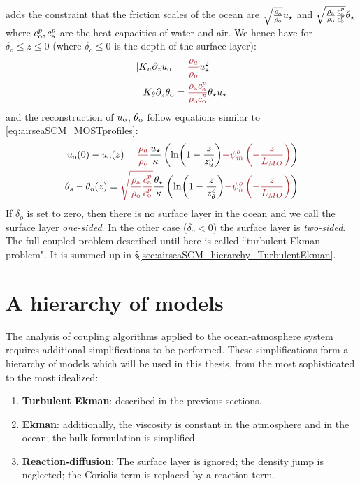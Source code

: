 adds the constraint that the friction scales of the ocean are
$\sqrt{\frac{\rho_{\rm a}} {\rho_{\rm o}}} u_\star$ and
$\sqrt{\frac{\rho_{\rm a}}{\rho_{\rm o}}
\frac{c_{\rm a}^p}{c_{\rm o}^p}}
\theta_\star$ where $c_{\rm o}^p, c_{\rm a}^p$
are the heat capacities of water and air.
We hence have for $\delta_o \leq z \leq 0$ (where $\delta_o \leq 0$
is the depth of the surface layer):
\begin{equation}
	\begin{aligned}
	|K_u \partial_z u_{\rm o}| &= \emphase{\frac{\rho_a}{\rho_o}}
	u_\star^2\\
	K_\theta \partial_z \theta_{\rm o} &=
	\emphase{\frac{\rho_{\rm a} c_{\rm a}^p}
			{\rho_{\rm o} c_{\rm o}^p}}
	\theta_\star u_\star
	\end{aligned}
\end{equation}
and the reconstruction of $u_{\rm o}$, $\theta_{\rm o}$
follow equations similar to \eqref{eq:airseaSCM_MOSTprofiles}:
\begin{equation}
\label{eq:airseaSCM_MOSTprofilesOSL}
\begin{aligned}
	u_{\rm o}(0)-u_{\rm o}(z) = \emphase{\frac{\rho_a}{\rho_o}}
	\frac{u_\star}{\kappa}
    \left(
	\ln(1-\frac{z}{z_{u}^o})
	\emphase{- \psi_m^o\left(-\frac{z}{L_{MO}}\right)}
    \right)
    \\
	\theta_s - \theta_{\rm o}(z) = 
	\emphase{\sqrt{\frac{\rho_{\rm a}}{\rho_{\rm o}}
	\frac{c_{\rm a}^p}{c_{\rm o}^p}}}
	\frac{{\theta_\star}}{\kappa}
    \left(
	\ln(1-\frac{z}{z_{\theta}^o})
	\emphase{- \psi_h^o\left(-\frac{z}{L_{MO}}\right)}
\right)
\end{aligned}
\end{equation}
If $\delta_o$ is set to zero, then there is no surface layer
in the ocean and we call the surface layer \textit{one-sided}.
In the other case ($\delta_o<0$) the surface layer is
\textit{two-sided}.
The full coupled problem described until here
is called ``turbulent Ekman problem". It is summed up in
\S\ref{sec:airseaSCM_hierarchy_TurbulentEkman}.
\section{A hierarchy of models}
\label{sec:airseaSCM_hierarchy}
The analysis of coupling algorithms applied to the
ocean-atmosphere system requires additional
simplifications to be performed.
These simplifications form a hierarchy of models which will
be used in this thesis, from
the most sophisticated to the most idealized:
\begin{enumerate}
	\item \textbf{Turbulent Ekman}: described in the previous
		sections.
	\item \textbf{Ekman}: additionally,
		the viscosity is constant in the
		atmosphere and in the ocean; the bulk formulation
		is simplified.
	\item \textbf{Reaction-diffusion}: The surface layer is ignored;
		the density jump is neglected;
		the Coriolis term is replaced by a reaction term.
\end{enumerate}
